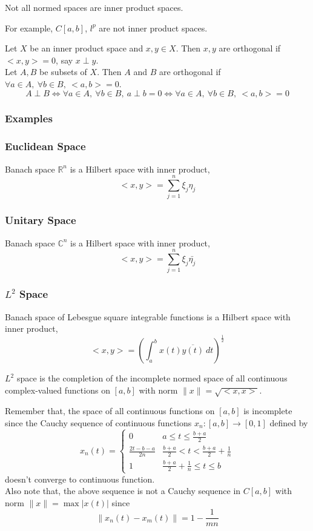 \begin{important}
	Not all normed spaces are inner product spaces.
\end{important}

	For example, $C[a,b]$, $l^p$ are not inner product spaces.

\begin{definition}[orthogonality]
	Let $X$ be an inner product space and  $x,y \in X$.
	Then $x,y$ are orthogonal if $<x,y> = 0$, say $x \perp y$.\\

	Let $A,B$ be subsets of $X$.
	Then $A$ and $B$ are orthogonal if $\forall a \in A,\ \forall b \in B,\ <a,b> = 0$.
	\[ A \perp B \iff \forall a \in A,\ \forall b \in B,\ a \perp b = 0 \iff \forall a \in A,\ \forall b \in B,\  <a,b> = 0 \]
\end{definition}
\subsubsection{Examples}
\subsubsection{Euclidean Space}
	Banach space $\mathbb{R}^n$ is a Hilbert space with inner product,
	\[ <x,y> = \sum_{j=1}^n \xi_j \eta_j \]
\subsubsection{Unitary Space}
	Banach space $\mathbb{C}^n$ is a Hilbert space with inner product,
	\[ <x,y> = \sum_{j=1}^n \xi_j \bar{\eta_j} \]
\subsubsection{$L^2$ Space}
	Banach space of Lebesgue square integrable functions is a Hilbert space with inner product,
	\[ <x,y> = \left(\int_a^b x(t)\overline{y(t)}\ dt \right)^\frac{1}{2} \]

	$L^2$ space is the completion of the incomplete normed space of all continuous complex-valued functions on $[a,b]$ with norm $\|x\| = \sqrt{<x,x>}$.\\

	\begin{commentary}
		Remember that, the space of all continuous functions on $[a,b]$ is incomplete since the Cauchy sequence of continuous functions $x_n : [a,b] \to [0,1]$ defined by
	\[ x_n(t) = \begin{cases} 0 & a \le t \le \frac{b+a}{2} \\ \frac{2t-b-a}{2n} & \frac{b+a}{2} < t < \frac{b+a}{2} + \frac{1}{n} \\ 1 & \frac{b+a}{2}+\frac{1}{n} \le t \le b \end{cases} \]
		doesn't converge to continuous function.\\

		Also note that, the above sequence is not a Cauchy sequence in $C[a,b]$ with norm $\|x\| = \max |x(t)|$ since 
		\[ \|x_n(t)-x_m(t)\| = 1-\frac{1}{mn} \]
	\end{commentary}
